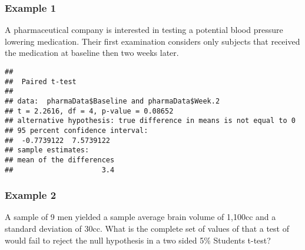 \documentclass[
]{article}
\newenvironment{Shaded}{\begin{snugshade}}{\end{snugshade}}
\newcommand{\DataTypeTok}[1]{\textcolor[rgb]{0.13,0.29,0.53}{#1}}
\newcommand{\DecValTok}[1]{\textcolor[rgb]{0.00,0.00,0.81}{#1}}
\newcommand{\FloatTok}[1]{\textcolor[rgb]{0.00,0.00,0.81}{#1}}
\newcommand{\KeywordTok}[1]{\textcolor[rgb]{0.13,0.29,0.53}{\textbf{#1}}}
\newcommand{\NormalTok}[1]{#1}
\newcommand{\OperatorTok}[1]{\textcolor[rgb]{0.81,0.36,0.00}{\textbf{#1}}}
\newcommand{\StringTok}[1]{\textcolor[rgb]{0.31,0.60,0.02}{#1}}
\begin{document}
\hypertarget{example-1-1}{%
\subsubsection{Example 1}\label{example-1-1}}

A pharmaceutical company is interested in testing a potential blood
pressure lowering medication. Their first examination considers only
subjects that received the medication at baseline then two weeks later.

\begin{Shaded}
\end{Shaded}

\begin{verbatim}
## 
##  Paired t-test
## 
## data:  pharmaData$Baseline and pharmaData$Week.2
## t = 2.2616, df = 4, p-value = 0.08652
## alternative hypothesis: true difference in means is not equal to 0
## 95 percent confidence interval:
##  -0.7739122  7.5739122
## sample estimates:
## mean of the differences 
##                     3.4
\end{verbatim}

\hypertarget{example-2}{%
\subsubsection{Example 2}\label{example-2}}

A sample of 9 men yielded a sample average brain volume of 1,100cc and a
standard deviation of 30cc. What is the complete set of values of that a
test of would fail to reject the null hypothesis in a two sided 5\%
Students t-test?
\end{document}
